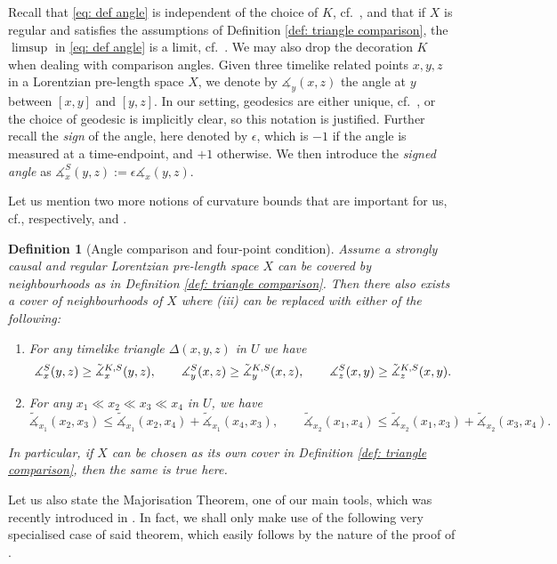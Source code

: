 \documentclass[hidelinks,12pt,a4paper]{article}
\numberwithin{equation}{section}
\theoremstyle{plain}
\newtheorem{definition}{Definition}[section]
\theoremstyle{definition}
\newcommand{\LpLS}{Lo\-rentz\-ian pre-length space }
\newcommand{\ma}{\ensuremath{\measuredangle}}
\newcommand{\tma}{\ensuremath{\Tilde{\measuredangle}}}
\begin{document}
Recall that \eqref{eq: def angle} is independent of the choice of $K$, cf.\ \cite[Proposition 2.14]{BS23}, and that if $X$ is regular and satisfies the assumptions of Definition \ref{def: triangle comparison}, the $\limsup$ in \eqref{eq: def angle} is a limit, cf.\ \cite[Lemma 4.10]{BS23}. 
We may also drop the decoration $K$ when dealing with comparison angles.
Given three timelike related points $x,y,z$ in a \LpLS $X$, we denote by $\ma_y(x,z)$ the angle at $y$ between $[x,y]$ and $[y,z]$. 
In our setting, geodesics are either unique, cf.\ \cite[Theorem 4.7]{BNR25}, or the choice of geodesic is implicitly clear, so this notation is justified. 
Further recall the \emph{sign} of the angle, here denoted by $\epsilon$, which is $-1$ if the angle is measured at a time-endpoint, and $+1$ otherwise. 
We then introduce the \emph{signed angle} as $\ma_x^S(y,z):=\epsilon\ma_x(y,z)$. 

Let us mention two more notions of curvature bounds that are important for us, cf., respectively, \cite[Definition 3.11]{BKR24} and \cite[Lemma 4.8]{BR25+}. 

\begin{definition}[Angle comparison and four-point condition]
\label{def: angle and 4pt}
Assume a strongly causal and regular \LpLS $X$ can be covered by neighbourhoods as in Definition \ref{def: triangle comparison}. 
Then there also exists a cover of neighbourhoods of $X$ where (iii) can be replaced with either of the following:
\begin{enumerate}[label=(\roman*)]
\item For any timelike triangle $\Delta(x,y,z)$ in $U$ we have 
\begin{equation*}
\ma^S_x(y,z) \geq \tma_x^{K,S}(y,z), \qquad \ma^S_y(x,z) \geq \tma_y^{K,S}(x,z), \qquad \ma^S_z(x,y) \geq \tma_z^{K,S}(x,y).
\end{equation*}
\item For any $x_1 \ll x_2 \ll x_3 \ll x_4$ in $U$, we have 
\begin{equation*}
\tilde{\ma}_{x_1}(x_2,x_3)\leq\tilde{\ma}_{x_1}(x_2,x_4)+\tilde{\ma}_{x_1}(x_4,x_3), \qquad \tilde{\ma}_{x_2}(x_1,x_4)\leq\tilde{\ma}_{x_2}(x_1,x_3)+\tilde{\ma}_{x_2}(x_3,x_4).
\end{equation*}
\end{enumerate}
In particular, if $X$ can be chosen as its own cover in Definition \ref{def: triangle comparison}, then the same is true here.
\end{definition}

Let us also state the Majorisation Theorem, one of our main tools, which was recently introduced in \cite{BR25+}. 
In fact, we shall only make use of the following very specialised case of said theorem, which easily follows by the nature of the proof of \cite[Theorem 3.9]{BR25+}.
\end{document}
